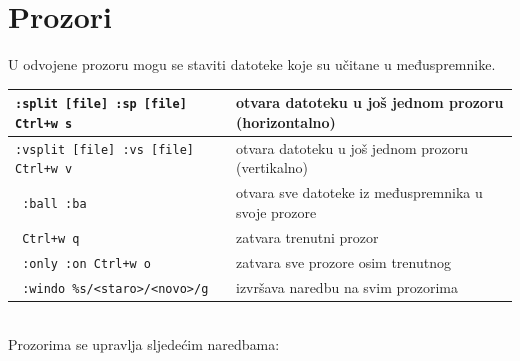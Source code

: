 \documentclass[10pt]{article}
\begin{document}
    \section*{\color{ForestGreen} Prozori}
    U odvojene prozoru mogu se staviti datoteke koje su učitane u međuspremnike.
    \\
    \begin{tabular}{|>{\tt}p{9.00cm}|>{}p{15.50cm}|}
        \hline
        :split [file] :sp [file] Ctrl+w s           & otvara datoteku u još jednom prozoru (horizontalno)                           \\ \hline
        :vsplit [file] :vs [file] Ctrl+w v          & otvara datoteku u još jednom prozoru (vertikalno)                             \\ \hline
        :ball :ba                                   & otvara sve datoteke iz međuspremnika u svoje prozore                          \\ \hline
        Ctrl+w q                                    & zatvara trenutni prozor                                                       \\ \hline
        :only :on Ctrl+w o                          & zatvara sve prozore osim trenutnog                                            \\ \hline
        :windo \%s/<staro>/<novo>/g                 & izvršava naredbu na svim prozorima                                            \\ \hline
    \end{tabular}         
    \\
    Prozorima se upravlja sljedećim naredbama:
    \\
\end{document}
